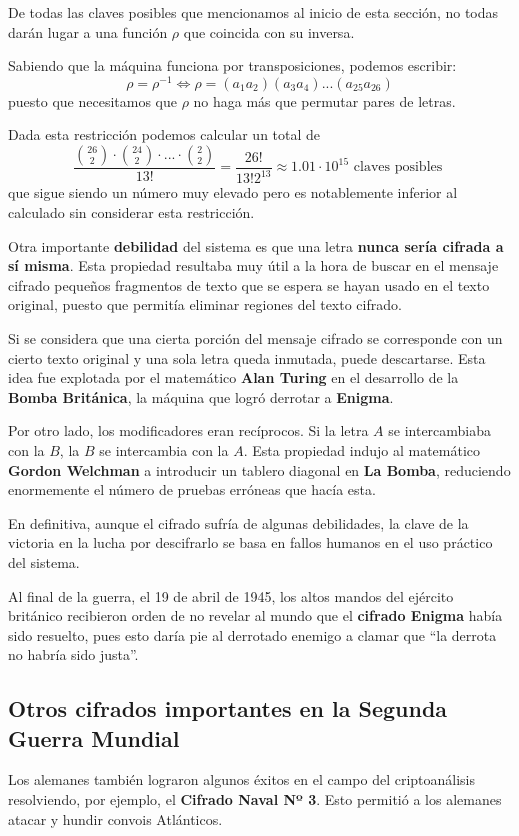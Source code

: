 \documentclass[nochap]{apuntesURJC}
\begin{document}
De todas las claves posibles que mencionamos al inicio de esta sección, no todas darán lugar a una función $\rho$ que coincida con su inversa.

Sabiendo que la máquina funciona por transposiciones, podemos escribir:
\[\rho = \rho^{-1} \iff \rho = (a_1a_2)(a_3a_4)...(a_{25}a_{26})\]
puesto que necesitamos que $\rho$ no haga más que permutar pares de letras.

Dada esta restricción podemos calcular un total de
\[\frac{{26 \choose 2} \cdot {24 \choose 2} \cdot ... \cdot {2 \choose 2}}{13!} =\frac{26!}{13!2^{13}} \approx 1.01 \cdot 10^{15} \text{ claves posibles }\]
que sigue siendo un número muy elevado pero es notablemente inferior al calculado sin considerar esta restricción.

Otra importante \textbf{debilidad} del sistema es que una letra \textbf{nunca sería cifrada a sí misma}. Esta propiedad resultaba muy útil a la hora de buscar en el mensaje cifrado pequeños fragmentos de texto que se espera se hayan usado en el texto original, puesto que permitía eliminar regiones del texto cifrado.

Si se considera que una cierta porción del mensaje cifrado se corresponde con un cierto texto original y una sola letra queda inmutada, puede descartarse. Esta idea fue explotada por el matemático \textbf{Alan Turing} en el desarrollo de la \textbf{Bomba Británica}, la máquina que logró derrotar a \textbf{Enigma}.

Por otro lado, los modificadores eran recíprocos. Si la letra $A$ se intercambiaba con la $B$, la $B$ se intercambia con la $A$. Esta propiedad indujo al matemático \textbf{Gordon Welchman} a introducir un tablero diagonal en \textbf{La Bomba}, reduciendo enormemente el número de pruebas erróneas que hacía esta.

En definitiva, aunque el cifrado sufría de algunas debilidades, la clave de la victoria en la lucha por descifrarlo se basa en fallos humanos en el uso práctico del sistema.

Al final de la guerra, el 19 de abril de 1945, los altos mandos del ejército británico recibieron orden de no revelar al mundo que el \textbf{cifrado Enigma} había sido resuelto, pues esto daría pie al derrotado enemigo a clamar que ``la derrota no habría sido justa''.

\subsection{Otros cifrados importantes en la Segunda Guerra Mundial}
Los alemanes también lograron algunos éxitos en el campo del criptoanálisis resolviendo, por ejemplo, el \textbf{Cifrado Naval Nº 3}. Esto permitió a los alemanes atacar y hundir convois Atlánticos.
\end{document}
